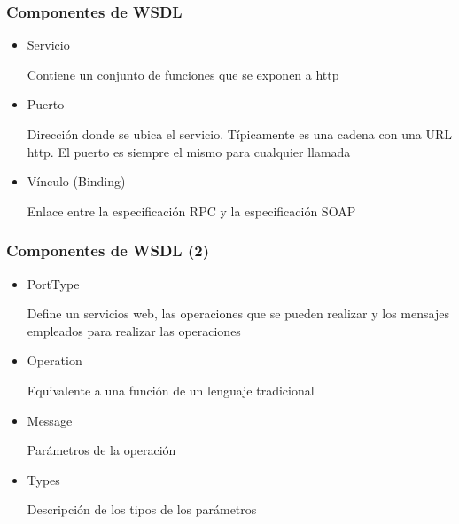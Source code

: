 \documentclass[ucs]{beamer}
\begin{document}
\begin{frame}[fragile]
\frametitle{Componentes de WSDL}
\begin{itemize}

\item
Servicio

Contiene un conjunto de funciones que se exponen a http
\item
Puerto

Dirección donde se ubica el servicio. Típicamente es una cadena con una URL http.
El puerto es siempre el mismo para cualquier llamada
\item
Vínculo (Binding)

Enlace entre la especificación RPC y la especificación SOAP



\end{itemize}
\end{frame}
\begin{frame}[fragile]
\frametitle{Componentes de WSDL (2)}
\begin{itemize}
\item
PortType

Define un servicios web, las operaciones que se pueden realizar y los mensajes empleados
para realizar las operaciones
\item
Operation

Equivalente a una función de un lenguaje tradicional
\item
Message

Parámetros de la operación
\item
Types

Descripción de los tipos de los parámetros
\end{itemize}

\end{frame}
\end{document}
